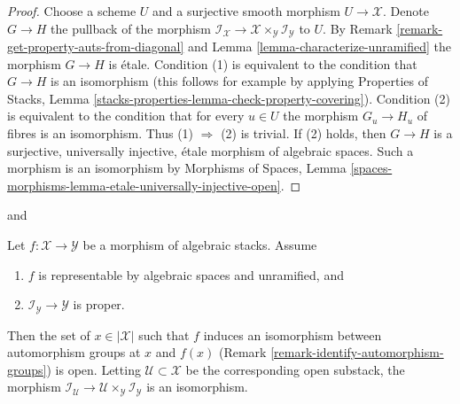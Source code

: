 \begin{proof}
Choose a scheme $U$ and a surjective smooth morphism $U \to \mathcal{X}$.
Denote $G \to H$ the pullback of the morphism
$\mathcal{I}_\mathcal{X} \to
\mathcal{X} \times_\mathcal{Y} \mathcal{I}_\mathcal{Y}$
to $U$. By Remark \ref{remark-get-property-auts-from-diagonal} and
Lemma \ref{lemma-characterize-unramified} the morphism $G \to H$ is \'etale.
Condition (1) is equivalent to the condition that
$G \to H$ is an isomorphism (this follows for example by applying
Properties of Stacks, Lemma
\ref{stacks-properties-lemma-check-property-covering}).
Condition (2) is equivalent to the condition that
for every $u \in U$ the morphism $G_u \to H_u$ of fibres
is an isomorphism. Thus (1) $\Rightarrow$ (2) is trivial.
If (2) holds, then $G \to H$ is a surjective, universally injective,
\'etale morphism of algebraic spaces. Such a morphism is an isomorphism by
Morphisms of Spaces, Lemma
\ref{spaces-morphisms-lemma-etale-universally-injective-open}.
\end{proof}

\begin{lemma}
\label{lemma-stabilizer-preserving-unramified}
\begin{reference}
\cite[Proposition 3.5]{rydh_quotients} and
\cite[Proposition 2.5]{alper_quotient}
\end{reference}
Let $f : \mathcal{X} \to \mathcal{Y}$ be a morphism of algebraic stacks.
Assume
\begin{enumerate}
\item $f$ is representable by algebraic spaces and unramified, and
\item $\mathcal{I}_\mathcal{Y} \to \mathcal{Y}$ is proper.
\end{enumerate}
Then the set of $x \in |\mathcal{X}|$ such that $f$ induces an
isomorphism between automorphism groups at $x$ and $f(x)$
(Remark \ref{remark-identify-automorphism-groups}) is open.
Letting $\mathcal{U} \subset \mathcal{X}$ be the corresponding open substack,
the morphism
$\mathcal{I}_\mathcal{U} \to
\mathcal{U} \times_\mathcal{Y} \mathcal{I}_\mathcal{Y}$
is an isomorphism.
\end{lemma}

